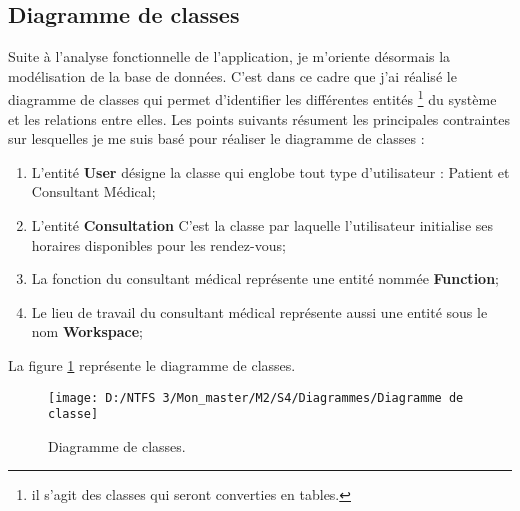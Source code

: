\subsection{Diagramme de classes}
Suite à l'analyse fonctionnelle de l'application, je m'oriente désormais la modélisation de la base de données. C’est dans ce cadre que j'ai réalisé le diagramme de classes qui permet d’identifier les différentes entités \footnote{il s’agit des classes qui seront converties en tables.} du système et les relations entre elles. \newline
Les points suivants résument les principales contraintes sur lesquelles je me suis basé pour réaliser le diagramme de classes :
\begin{enumerate}
	\item L'entité \textbf{User} désigne la classe qui englobe tout type d'utilisateur : Patient et Consultant Médical;
	\item L'entité \textbf{Consultation} C'est la classe par laquelle l'utilisateur initialise ses horaires disponibles pour les rendez-vous;
	\item La fonction du consultant médical représente une entité nommée \textbf{Function};
	\item Le lieu de travail du consultant médical représente aussi une entité sous le nom \textbf{Workspace};
\end{enumerate}
La figure \ref{Figure 4.9} représente le diagramme de classes.
\begin{figure}[h]
	\texttt{[image: D:/NTFS 3/Mon\_master/M2/S4/Diagrammes/Diagramme de classe]}
	\centering
	\caption{Diagramme de classes.}
	\label{Figure 4.9}
\end{figure}